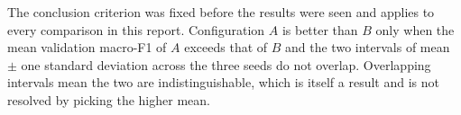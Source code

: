 The conclusion criterion was fixed before the results were seen and applies to every comparison
in this report. Configuration $A$ is better than $B$ only when the mean validation macro-F1 of
$A$ exceeds that of $B$ and the two intervals of mean $\pm$ one standard deviation across the
three seeds do not overlap. Overlapping intervals mean the two are indistinguishable, which is
itself a result and is not resolved by picking the higher mean.
